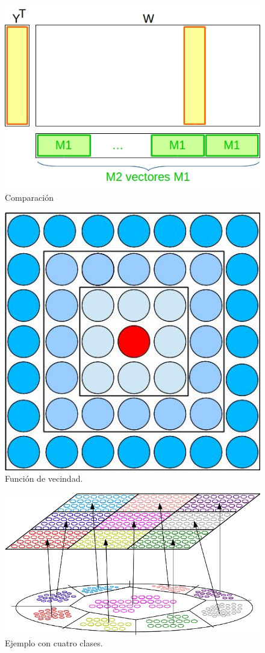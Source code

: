 \begin{figure}[ht!]
	\centering
	\includegraphics[width=0.7\linewidth]{img/parte2-comparacion.jpg}
	\caption{Comparación}
\end{figure}

\begin{figure}[ht!]
	\centering
	\includegraphics[width=0.3\linewidth]{img/parte2-vecindario.jpg}
	\caption{Función de vecindad.}
\end{figure}


\begin{figure}[ht!]
	\centering
	\includegraphics[width=0.8\linewidth]{img/parte2-kohonen9clases.jpg}
	\caption{Ejemplo con cuatro clases.}
\end{figure}

